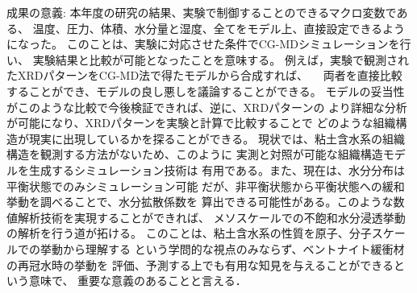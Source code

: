     成果の意義: 本年度の研究の結果、実験で制御することのできるマクロ変数である、 温度、圧力、体積、水分量と湿度、全てをモデル上、直接設定できるようになった。 このことは、実験に対応させた条件でCG-MDシミュレーションを行い、 実験結果と比較が可能となったことを意味する。 例えば，実験で観測されたXRDパターンをCG-MD法で得たモデルから合成すれば、 　両者を直接比較することができ、モデルの良し悪しを議論することができる。 モデルの妥当性がこのような比較で今後検証できれば、逆に、XRDパターンの より詳細な分析が可能になり、XRDパターンを実験と計算で比較することで どのような組織構造が現実に出現しているかを探ることができる。 現状では、粘土含水系の組織構造を観測する方法がないため、このように 実測と対照が可能な組織構造モデルを生成するシミュレーション技術は 有用である。また、現在は、水分分布は平衡状態でのみシミュレーション可能 だが、非平衡状態から平衡状態への緩和挙動を調べることで、水分拡散係数を 算出できる可能性がある。このような数値解析技術を実現することができれば、 メソスケールでの不飽和水分浸透挙動の解析を行う道が拓ける。 このことは、粘土含水系の性質を原子、分子スケールでの挙動から理解する という学問的な視点のみならず、ベントナイト緩衝材の再冠水時の挙動を 評価、予測する上でも有用な知見を与えることができるという意味で、 重要な意義のあることと言える．


